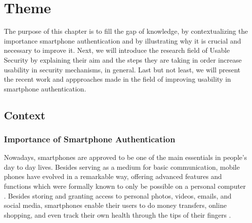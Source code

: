 
\chapter{Theme}\label{ch:second}

The purpose of this chapter is to fill the gap of knowledge, by contextualizing the importance smartphone authentication and by illustrating why it is crucial and necessary to improve it. Next, we will introduce the research field of Usable Security by explaining their aim and the steps they are taking in order increase usability in security mechanisms, in general. Last but not least, we will present the recent work and appproaches made in the field of improving usability in smartphone authentication.   

\section{Context}

\subsection{Importance of Smartphone Authentication}

Nowadays, smartphones are approved to be one of the main essentials in people's day to day lives. Besides serving as a medium for basic communication, mobile phones have evolved in a remarkable way, offering advanced features and functions which were formally known to only be possible on a personal computer \cite{Alsaleh}. Besides storing and granting access to personal photos, videos, emails, and social media, smartphones enable their users to do money transfers, online shopping, and even track their own health through the tips of their fingers \cite{Egelman:2014:YRL:2660267.2660273,Albayram:2017:BUL:3235924.3235929,Schloeglhofer}. \\

